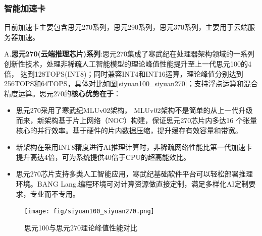 \subsubsection{智能加速卡}
目前加速卡主要包含思元270系列，思元290系列，思元370系列，主要用于云端服务器加速。\par
A.\textbf{思元270(云端推理芯片)系列}:思元270集成了寒武纪在处理器架构领域的一系列创新性技术，处理非稀疏人工智能模型的理论峰值性能提升至上一代思元100的4倍，
达到128TOPS(INT8)；同时兼容INT4和INT16运算，理论峰值分别达到256TOPS和64TOPS，具体对比如图\ref{siyuan100_siyuan270}；支持浮点运算和混合精度运算。思元270的\textbf{核心优势在于}：
\begin{itemize}
  \item 思元270采用了寒武纪MLUv02架构，
  MLUv02架构不是简单的从上一代升级而来，新架构基于片上网络（NOC）构建，保证思元270芯片内多达16 个张量核心的并行效率。基于硬件的片内数据压缩，提升缓存有效容量和带宽。
  \item 新架构在采用INT8精度进行AI推理计算时，非稀疏网络性能比第一代加速卡提升高达4倍，可为系统提供40倍于CPU的超高能效比。
  \item 思元270芯片支持多类人工智能应用，寒武纪基础软件平台可以轻松部署推理环境。BANG Lang.编程环境可对计算资源做直接定制，满足多样化AI定制要求，专业而不专用。
\end{itemize}

\begin{figure}[!htb]
  \centering
  \texttt{[image: fig/siyuan100\_siyuan270.png]}
  \caption{思元100与思元270理论峰值性能对比}
  \label{cambricon_software_framework}
\end{figure}

